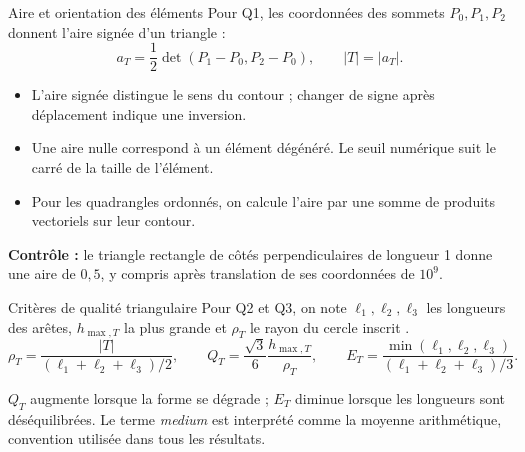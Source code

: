 \documentclass[12pt,aspectratio=169,t]{beamer}
\begin{document}
\begin{frame}{Aire et orientation des éléments}
Pour Q1, les coordonnées des sommets $P_0,P_1,P_2$ donnent l'aire signée d'un triangle :
\[
a_T=\frac12\det(P_1-P_0,P_2-P_0),\qquad |T|=|a_T|.
\]
\begin{itemize}
\item L'aire signée distingue le sens du contour ; changer de signe après déplacement indique une inversion.
\item Une aire nulle correspond à un élément dégénéré. Le seuil numérique suit le carré de la taille de l'élément.
\item Pour les quadrangles ordonnés, on calcule l'aire par une somme de produits vectoriels sur leur contour.
\end{itemize}
\textbf{Contrôle :} le triangle rectangle de côtés perpendiculaires de longueur 1 donne une aire de $0,5$, y compris après translation de ses coordonnées de $10^9$.
\end{frame}

\begin{frame}{Critères de qualité triangulaire}
Pour Q2 et Q3, on note $\ell_1,\ell_2,\ell_3$ les longueurs des arêtes, $h_{\max,T}$ la plus grande et $\rho_T$ le rayon du cercle inscrit \cite{mesh}.
\[
\rho_T=\frac{|T|}{(\ell_1+\ell_2+\ell_3)/2},\qquad
Q_T=\frac{\sqrt3}{6}\frac{h_{\max,T}}{\rho_T},\qquad
E_T=\frac{\min(\ell_1,\ell_2,\ell_3)}{(\ell_1+\ell_2+\ell_3)/3}.
\]
\par{}\smallskip
$Q_T$ augmente lorsque la forme se dégrade ; $E_T$ diminue lorsque les longueurs sont déséquilibrées. Le terme \emph{medium} est interprété comme la moyenne arithmétique, convention utilisée dans tous les résultats.
\end{frame}
\end{document}
